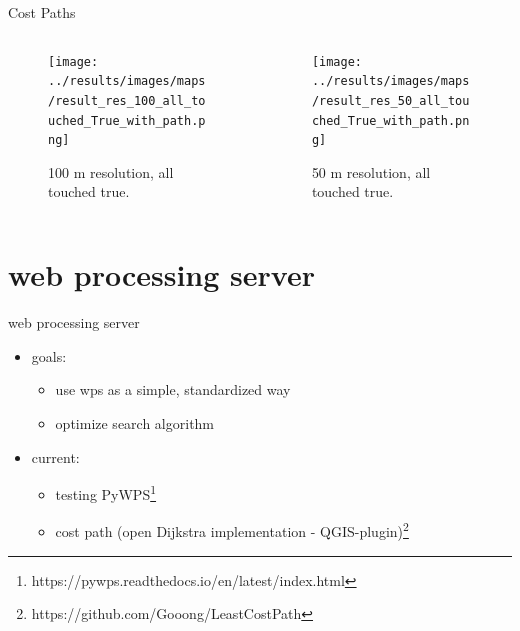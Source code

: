 \documentclass[usenames,dvipsnames,aspectratio=169]{beamer}
\begin{document}
\begin{frame}{Cost Paths}
	\begin{columns}[T] %
		\begin{column}{.48\textwidth}
			\begin{figure}[htb]
				\texttt{[image: ../results/images/maps/result\_res\_100\_all\_touched\_True\_with\_path.png]}
				\caption{100 m resolution, all touched true.}
			\end{figure}
		\end{column}
		\begin{column}{.48\textwidth}
			\begin{figure}[htb]
				\texttt{[image: ../results/images/maps/result\_res\_50\_all\_touched\_True\_with\_path.png]}
				\caption{50 m resolution, all touched true.}
			\end{figure}
		\end{column}
	\end{columns}
\end{frame}

\section{web processing server}
\begin{frame}{web processing server}
	\begin{itemize}
		\item goals: 
		\begin{itemize}
			\item use wps as a simple, standardized way
			\item optimize search algorithm
		\end{itemize}
		\item current: 
		\begin{itemize}
			\item testing PyWPS\footnote{https://pywps.readthedocs.io/en/latest/index.html}
			\item cost path (open Dijkstra implementation - QGIS-plugin)\footnote{https://github.com/Gooong/LeastCostPath}
		\end{itemize}
	\end{itemize}
\end{frame}
\end{document}

